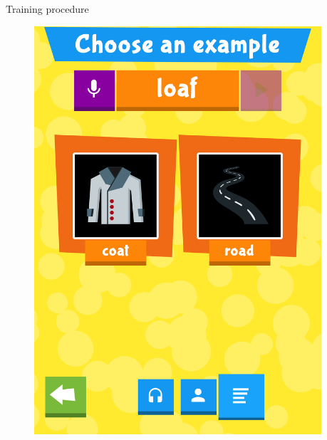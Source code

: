 \documentclass[final,xcolor={cmyk,hyperref}]{beamer}
\begin{document}
\begin{frame}[t]
\begin{columns}[t]
\begin{column}{0.45\linewidth}
\begin{block}{Training procedure}
\begin{figure}[h]
\begin{columns}
\begin{column}{\screenshotwidth}
    \includegraphics[width=\linewidth]{images/CALVin-screenshots/jpgs/choose_example}
  \end{column}
  \begin{column}{\screenshotwidth}

\end{column}
\end{columns}
\end{figure}
\end{block}
\end{column}
\end{columns}
\end{frame}
\end{document}
